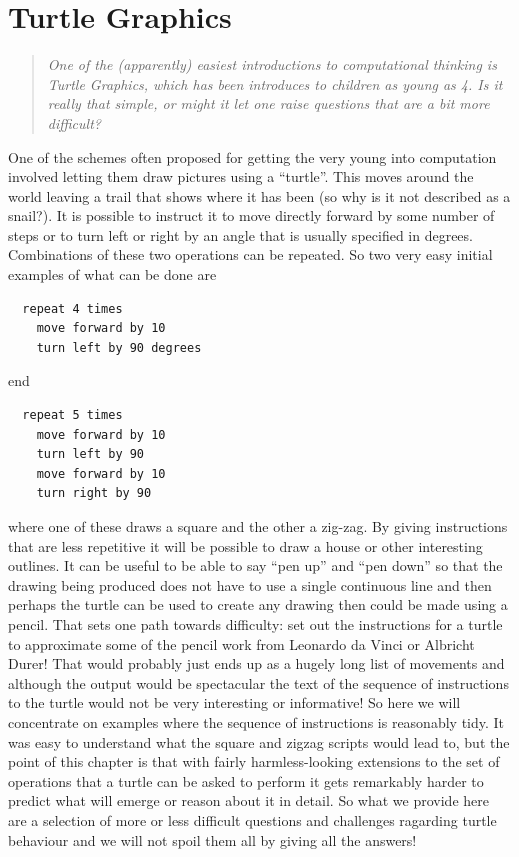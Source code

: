 \section{Turtle Graphics}
\begin{quotation}\textit{
One of the (apparently) easiest introductions to computational thinking
is Turtle Graphics, which has been introduces to children as young as 4.
Is it really that simple, or might it let one raise questions that are
a bit more difficult?
}\end{quotation}
One of the schemes often proposed for getting the very young into
computation involved letting them draw pictures using a ``turtle''.
This moves around the world leaving a trail that shows where it has been
(so why is it not described as a snail?). It is possible to instruct it
to move directly forward by some number of steps or to turn left or
right by an angle that is usually specified in degrees. Combinations
of these two operations can be repeated. So two very easy initial examples
of what can be done are
\begin{verbatim}
  repeat 4 times
    move forward by 10
    turn left by 90 degrees
\end{verbatim}
end
\begin{verbatim}
  repeat 5 times
    move forward by 10
    turn left by 90
    move forward by 10
    turn right by 90
\end{verbatim}
where one of these draws a square and the other a zig-zag. By giving
instructions that are less repetitive it will be possible to draw a house
or other interesting outlines. It can be useful to be able to say
``pen up'' and ``pen down'' so that the drawing being produced does not
have to use a single continuous line and then perhaps the turtle can be
used to create any drawing then could be made using a pencil. That sets
one path towards difficulty: set out the instructions for a turtle to
approximate some of the pencil work from Leonardo da Vinci or Albricht
Durer! That would probably just ends up as a hugely long list of movements
and although the output would be spectacular the text of the sequence of
instructions to the turtle would not be very interesting or informative!
So here we will concentrate on examples where the sequence of instructions
is reasonably tidy. It was easy to understand what the square and zigzag
scripts would lead to, but the point of this chapter is that with fairly
harmless-looking extensions to the set of operations that a turtle can
be asked to perform it gets remarkably harder to predict what will
emerge or reason about it in detail. So what we provide here are a
selection of more or less difficult questions and challenges ragarding
turtle behaviour and we will not spoil them all by giving all the
answers!

